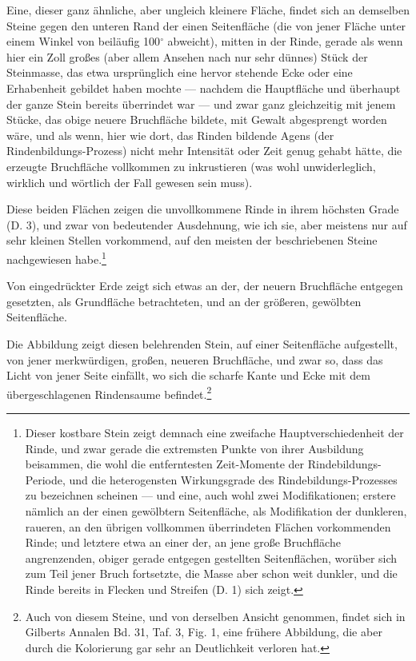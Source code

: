 \documentclass[a4paper, 11pt, oneside, german]{article}
\begin{document}
Eine, dieser ganz ähnliche, aber ungleich kleinere Fläche, findet sich an demselben Steine gegen den unteren Rand der einen Seitenfläche (die von jener Fläche unter einem Winkel von beiläufig 100$^{\circ}$ abweicht), mitten in der Rinde, gerade als wenn hier ein Zoll großes (aber allem Ansehen nach nur sehr dünnes) Stück der Steinmasse, das etwa ursprünglich eine hervor stehende Ecke oder eine Erhabenheit gebildet haben mochte --- nachdem die Hauptfläche und überhaupt der ganze Stein bereits überrindet war --- und zwar ganz gleichzeitig mit jenem Stücke, das obige neuere Bruchfläche bildete, mit Gewalt abgesprengt worden wäre, und als wenn, hier wie dort, das Rinden bildende Agens (der Rindenbildungs-Prozess) nicht mehr Intensität oder Zeit genug gehabt hätte, die erzeugte Bruchfläche vollkommen zu inkrustieren (was wohl unwiderleglich, wirklich und wörtlich der Fall gewesen sein muss).

Diese beiden Flächen zeigen die unvollkommene Rinde in ihrem höchsten Grade (D. 3), und zwar von bedeutender Ausdehnung, wie ich sie, aber meistens nur auf sehr kleinen Stellen vorkommend, auf den meisten der beschriebenen Steine nachgewiesen habe.\footnote{Dieser kostbare Stein zeigt demnach eine zweifache Hauptverschiedenheit der Rinde, und zwar gerade die extremsten Punkte von ihrer Ausbildung beisammen, die wohl die entferntesten Zeit-Momente der Rindebildungs-Periode, und die heterogensten Wirkungsgrade des Rindebildungs-Prozesses zu bezeichnen scheinen --- und eine, auch wohl zwei Modifikationen; erstere nämlich an der einen gewölbtern Seitenfläche, als Modifikation der dunkleren, raueren, an den übrigen vollkommen überrindeten Flächen vorkommenden Rinde; und letztere etwa an einer der, an jene große Bruchfläche angrenzenden, obiger gerade entgegen gestellten Seitenflächen, worüber sich zum Teil jener Bruch fortsetzte, die Masse aber schon weit dunkler, und die Rinde bereits in Flecken und Streifen (D. 1) sich zeigt.}

Von eingedrückter Erde zeigt sich etwas an der, der neuern Bruchfläche entgegen gesetzten, als Grundfläche betrachteten, und an der größeren, gewölbten Seitenfläche.

Die Abbildung zeigt diesen belehrenden Stein, auf einer Seitenfläche aufgestellt, von jener merkwürdigen, großen, neueren Bruchfläche, und zwar so, dass das Licht von jener Seite einfällt, wo sich die scharfe Kante und Ecke mit dem übergeschlagenen Rindensaume befindet.\footnote{Auch von diesem Steine, und von derselben Ansicht genommen, findet sich in Gilberts Annalen Bd. 31, Taf. 3, Fig. 1, eine frühere Abbildung, die aber durch die Kolorierung gar sehr an Deutlichkeit verloren hat.}
\end{document}
